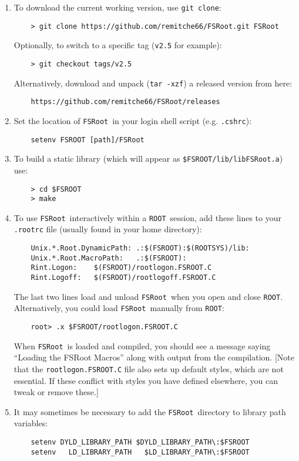 \documentclass[11pt]{article}
\newcommand{\FSR}{{\tt FSRoot}}
\newcommand{\ROOT}{{\tt ROOT}}
\begin{document}
\begin{enumerate}

\item To download the current working version, use {\tt git clone}:
\begin{verbatim}
    > git clone https://github.com/remitche66/FSRoot.git FSRoot
\end{verbatim}
Optionally, to switch to a specific tag ({\tt v2.5} for example):
\begin{verbatim}
    > git checkout tags/v2.5
\end{verbatim}
Alternatively, download and unpack ({\tt tar -xzf}) a released version from here:
\begin{verbatim}
    https://github.com/remitche66/FSRoot/releases
\end{verbatim}


\item Set the location of \FSR\ in your login shell script (e.g. {\tt .cshrc}):
\begin{verbatim}
    setenv FSROOT [path]/FSRoot
\end{verbatim}

\item To build a static library (which will appear as {\tt \$FSROOT/lib/libFSRoot.a}) use:
\begin{verbatim}
    > cd $FSROOT
    > make
\end{verbatim}

\item To use \FSR\ interactively within a \ROOT\ session, add these lines to your {\tt .rootrc} file (usually found in your home directory):
\begin{verbatim}
    Unix.*.Root.DynamicPath: .:$(FSROOT):$(ROOTSYS)/lib:
    Unix.*.Root.MacroPath:   .:$(FSROOT):
    Rint.Logon:    $(FSROOT)/rootlogon.FSROOT.C
    Rint.Logoff:   $(FSROOT)/rootlogoff.FSROOT.C
\end{verbatim}
The last two lines load and unload \FSR\ when you open and close \ROOT.
Alternatively, you could load \FSR\ manually from \ROOT:
\begin{verbatim}
    root> .x $FSROOT/rootlogon.FSROOT.C
\end{verbatim}
When \FSR\ is loaded and compiled, you should see a message saying ``Loading the FSRoot Macros'' along with output from the compilation.  [Note that the {\tt rootlogon.FSROOT.C} file also sets up default styles, which are not essential.  If these conflict with styles you have defined elsewhere, you can tweak or remove these.]

\item It may sometimes be necessary to add the \FSR\ directory to library path variables:
\begin{verbatim}
    setenv DYLD_LIBRARY_PATH $DYLD_LIBRARY_PATH\:$FSROOT
    setenv   LD_LIBRARY_PATH   $LD_LIBRARY_PATH\:$FSROOT
\end{verbatim}

\end{enumerate}
\end{document}
